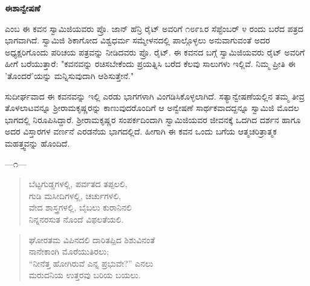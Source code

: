 

\begin{center}
\textbf{ಈಶಾನ್ವೇಷಣೆ}
\end{center}

 ಎಂಬ ಈ ಕವನ ಸ್ವಾಮಿಜಿಯವರು ಪ್ರೊ. ಜಾನ್ ಹೆನ್ರಿ ರೈಟ್ ಅವರಿಗೆ ೧೮೯೩ರ ಸೆಪ್ಟೆಂಬರ್ ೪ ರಂದು ಬರೆದ ಪತ್ರದ ಭಾಗವಾಗಿದೆ. ಸ್ವಾಮಿಜಿ ಶಿಕಾಗೋದ ವಿಶ್ವಧರ್ಮ ಸಮ್ಮೇಳನದಲ್ಲಿ ಪಾಲ್ಗೊಳ್ಳಲು ಅನುವಾಗುವಂತೆ ಅದರ ಅಧ್ಯಕ್ಷರಿಗೊಂದು ಪರಿಚಯ ಪತ್ರವನ್ನು ನೀಡಿದವರು ಪ್ರೊ. ರೈಟ್. ಈ ಕವನದ ಬಗ್ಗೆ ಸ್ವಾಮಿಜಿಯವರು ರೈಟ್ ಅವರಿಗೆ ಹೀಗೆ ಬರೆಯುತ್ತಾರೆ: "ಕವನವನ್ನು ರಚಿಸಬೇಕೆಂದು ಪ್ರಯತ್ನಿಸಿ ಬರೆದ ಕೆಲವು ಸಾಲುಗಳು ಇಲ್ಲಿವೆ. ನಿಮ್ಮ ಪ್ರೀತಿ ಈ 'ತೊಂದರೆ'ಯನ್ನು ಮನ್ನಿಸುವುದಾಗಿ ಆಶಿಸುತ್ತೇನೆ."

ಸುದೀರ್ಘವಾದ ಈ ಕವನವನ್ನು ಇಲ್ಲಿ ಎರಡು ಭಾಗಗಳಾಗಿ ವಿಂಗಡಿಸಿಕೊಳ್ಳಲಾಗಿದೆ. ಸತ್ಯಾನ್ವೇಷಣೆಯಲ್ಲಿನ ತಮ್ಮ ತೀವ್ರ ತೊಳಲಾಟವನ್ನೂ ಶ‍್ರೀರಾಮಕೃಷ್ಣರನ್ನು ಕಾಣುವುದರೊಂದಿಗೆ ಆ ಅನ್ವೇಷಣೆ ಸಾರ್ಥಕವಾದದ್ದನ್ನೂ ಸ್ವಾಮಿಜಿ ಮೊದಲ ಭಾಗದಲ್ಲಿ ನಿರೂಪಿಸಿದ್ದಾರೆ. ಶ‍್ರೀರಾಮಕೃಷ್ಣರ ಸಂಪರ್ಕದಿಂದಾಗಿ ಸ್ವಾಮಿಜಿಯವರ ಜೀವನಕ್ಕೆ ಒದಗಿದ ದರ್ಶನ ಹಾಗೂ ಅದರ ವಿಸ್ತಾರಗಳ ವರ್ಣನೆ ಎರಡನೆಯ ಭಾಗದಲ್ಲಿದೆ. ಹೀಗಾಗಿ ಈ ಕವನ ಒಂದು ಬಗೆಯ ಆತ್ಮಚರಿತ್ರಾತ್ಮಕ ಮಹತ್ತ್ವವನ್ನು ಹೊಂದಿದೆ.

\begin{center}
—೧—
\end{center}

\begin{verse}
ಬೆಟ್ಟಗುಡ್ಡಗಳಲ್ಲಿ, ಪರ್ವತದ ತಪ್ಪಲಲಿ,\\ಗುಡಿ ಮಸೀದಿಗಳಲ್ಲಿ, ಚರ್ಚುಗಳಲಿ,\\ವೇದ ಶಾಸ್ತ್ರಗಳಲ್ಲಿ, ಬೈಬಲು ಕುರಾನಿನಲಿ\\ನಿನ್ನನರಸುತ ನೊಂದೆ ವಿಫಲತೆಯಲಿ.
\end{verse}

\begin{verse}
ಘೋರತಮ ವಿಪಿನದಲಿ ದಾರಿತಪ್ಪಿದ ಶಿಶುವಿನಂತೆ\\ನಾನೇಕಾಂಗಿ ಮೊರೆಯುತಿರಲು;\\“ನೀನೆತ್ತ ಹೋಗಿರುವೆ ಎನ್ನ ಪ್ರಭುವೇ?” ಎನಲು\\ಮರುದನಿಯ ಉತ್ತರವು ಬರಿಯ ಬಯಲು.
\end{verse}

